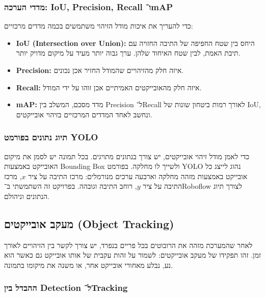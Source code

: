 \subsubsection{מדדי הערכה: \textenglish{IoU}, \textenglish{Precision},
\textenglish{Recall} ו־\textenglish{mAP}}

כדי להעריך את איכות מודל הזיהוי משתמשים בכמה מדדים מרכזיים:
\begin{itemize}
\item \textbf{\textenglish{IoU (Intersection over Union)}:} היחס בין
  שטח החפיפה של התיבה החזויה עם תיבת האמת, לבין שטח האיחוד שלהן. ערך
  גבוה יותר מעיד על מיקום מדויק יותר.
\item \textbf{\textenglish{Precision}:} איזה חלק מהזיהויים שהמודל
  החזיר אכן נכונים.
\item \textbf{\textenglish{Recall}:} איזה חלק מהאובייקטים האמיתיים אכן
  זוהו על ידי המודל.
\item \textbf{\textenglish{mAP}:} מדד מסכם, המשלב בין
  \textenglish{Precision} ל־\textenglish{Recall} לאורך רמות ביטחון
  שונות של \textenglish{IoU}, ונחשב לאחד המדדים המרכזיים בזיהוי
  אובייקטים.
\end{itemize}

\subsubsection{תיוג נתונים בפורמט \textenglish{YOLO}}

כדי לאמן מודל זיהוי אובייקטים, יש צורך בנתונים מתויגים. בכל תמונה יש
לסמן את מיקום האובייקט באמצעות \textenglish{Bounding Box} ולשייך לו
מחלקה. בפורמט \textenglish{YOLO} נהוג לייצג כל אובייקט באמצעות מזהה
מחלקה וארבעה ערכים מנורמלים: מרכז התיבה על ציר $x$, מרכז התיבה על ציר
$y$, רוחב התיבה וגובהה. בפרויקט זה השתמשתי ב־\textenglish{Roboflow}
לצורך תיוג הנתונים וניהולם.

\subsection{מעקב אובייקטים (\textenglish{Object Tracking})}

לאחר שהמערכת מזהה את הרובוטים בכל פריים בנפרד, יש צורך לקשר בין
הזיהויים לאורך זמן. זהו תפקידו של מעקב אובייקטים: לשמור על זהות עקבית
של אותו אובייקט גם כאשר הוא נע, נבלע מאחורי אובייקט אחר, או משנה את
מיקומו בתמונה.

\subsubsection{ההבדל בין \textenglish{Detection}
ל־\textenglish{Tracking}}

